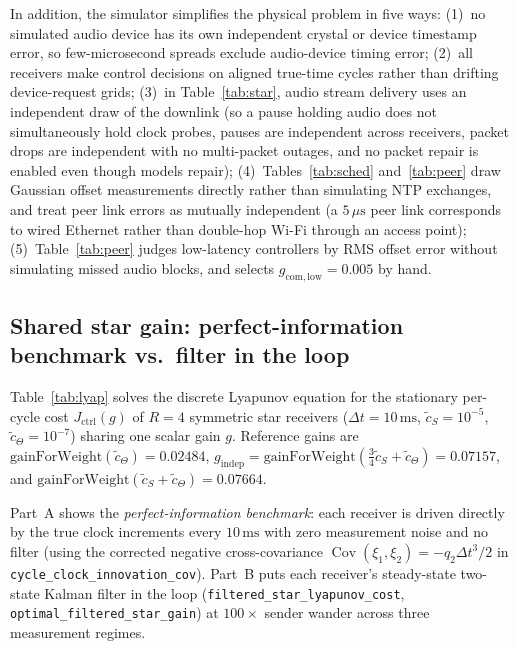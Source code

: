 \documentclass[11pt,a4paper]{article}
\theoremstyle{definition}
\begin{document}
In addition, the simulator simplifies the physical problem in five ways:
(1)~no simulated audio device has its own independent crystal or device
timestamp error, so few-microsecond spreads exclude audio-device timing error;
(2)~all receivers make control decisions on aligned true-time cycles rather
than drifting device-request grids;
(3)~in Table~\ref{tab:star}, audio stream delivery uses an independent draw of
the downlink (so a pause holding audio does not simultaneously hold clock
probes, pauses are independent across receivers, packet drops are independent
with no multi-packet outages, and no packet repair is enabled even though
 models repair);
(4)~Tables~\ref{tab:sched} and~\ref{tab:peer} draw Gaussian offset
measurements directly rather than simulating NTP exchanges, and treat peer
link errors as mutually independent (a $5\,\mu\text{s}$ peer link corresponds
to wired Ethernet rather than double-hop Wi-Fi through an access point);
(5)~Table~\ref{tab:peer} judges low-latency controllers by RMS offset error
without simulating missed audio blocks, and selects $g_{\mathrm{com,low}} = 0.005$
by hand.

\subsection{Shared star gain: perfect-information benchmark vs.\ filter in the loop}
\label{sec:sim-lyap}

Table~\ref{tab:lyap} solves the discrete Lyapunov equation for the stationary
per-cycle cost $J_{\mathrm{ctrl}}(g)$ of $R = 4$ symmetric star receivers
($\Delta t = 10\,\text{ms}$, $\tilde c_S = 10^{-5}$, $\tilde c_\Theta = 10^{-7}$)
sharing one scalar gain $g$. Reference gains are
$\mathrm{gainForWeight}(\tilde c_\Theta) = 0.02484$,
$g_{\mathrm{indep}} = \mathrm{gainForWeight}(\frac{3}{4}\tilde c_S + \tilde c_\Theta) = 0.07157$,
and $\mathrm{gainForWeight}(\tilde c_S + \tilde c_\Theta) = 0.07664$.

Part~A shows the \emph{perfect-information benchmark}: each receiver is driven
directly by the true clock increments every $10\,\text{ms}$ with zero
measurement noise and no filter (using the corrected negative cross-covariance
$\operatorname{Cov}(\xi_1, \xi_2) = -q_2 \Delta t^3 / 2$ in
\texttt{cycle\_clock\_innovation\_cov}). Part~B puts each receiver's steady-state
two-state Kalman filter in the loop (\texttt{filtered\_star\_lyapunov\_cost},
\texttt{optimal\_filtered\_star\_gain}) at $100\times$ sender wander across
three measurement regimes.
\end{document}
